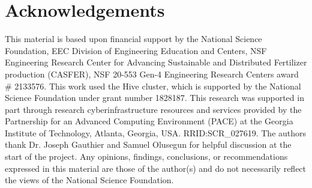 \documentclass[twoside,twocolumn,9pt]{article}
\renewcommand{\refname}{Notes and references}
\begin{document}
\section*{Acknowledgements}
This material is based upon financial support by the National Science Foundation, EEC Division of Engineering Education and Centers, NSF Engineering Research Center for Advancing Sustainable and Distributed Fertilizer production (CASFER), NSF 20-553 Gen-4 Engineering Research Centers award \# 2133576. This work used the Hive cluster, which is supported by the National Science Foundation under grant number 1828187.  This research was supported in part through research cyberinfrastructure resources and services provided by the Partnership for an Advanced Computing Environment (PACE) at the Georgia Institute of Technology, Atlanta, Georgia, USA. RRID:SCR\_027619. The authors thank Dr. Joseph Gauthier and Samuel Olusegun for helpful discussion at the start of the project. Any opinions, findings, conclusions, or recommendations expressed in this material are those of the author(s) and do not necessarily reflect the views of the National Science Foundation. 



\balance



\clearpage
% 
\end{document}
